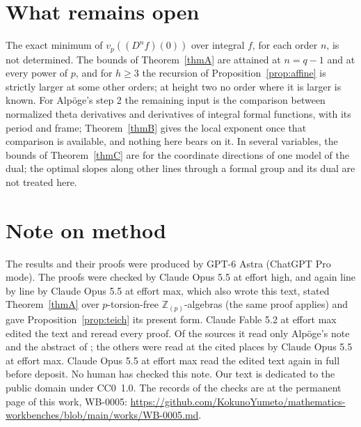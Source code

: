 \documentclass[11pt]{amsart}
\newcommand{\workbenchurl}{https://github.com/KokunoYumeto/mathematics-workbenches/blob/main/works/WB-0005.md}
\theoremstyle{definition}
\theoremstyle{remark}
\newcommand{\Z}{\mathbb Z}
\newcommand{\vp}{v_p}
\begin{document}
\section{What remains open}
The exact minimum of $\vp((D^nf)(0))$ over integral $f$, for each order $n$, is not determined. The bounds of Theorem~\ref{thmA} are attained at $n=q-1$ and at every power of $p$, and for $h\ge3$ the recursion of Proposition~\ref{prop:affine} is strictly larger at some other orders; at height two no order where it is larger is known. For Alp\"oge's step 2 the remaining input is the comparison between normalized theta derivatives and derivatives of integral formal functions, with its period and frame; Theorem~\ref{thmB} gives the local exponent once that comparison is available, and nothing here bears on it. In several variables, the bounds of Theorem~\ref{thmC} are for the coordinate directions of one model of the dual; the optimal slopes along other lines through a formal group and its dual are not treated here.

\section*{Note on method}
The results and their proofs were produced by GPT-6 Astra (ChatGPT Pro mode). The proofs were checked by Claude Opus 5.5 at effort high, and again line by line by Claude Opus 5.5 at effort max, which also wrote this text, stated Theorem~\ref{thmA} over $p$-torsion-free $\Z_{(p)}$-algebras (the same proof applies) and gave Proposition~\ref{prop:teich} its present form. Claude Fable 5.2 at effort max edited the text and reread every proof. Of the sources it read only Alp\"oge's note and the abstract of \cite{Three}; the others were read at the cited places by Claude Opus 5.5 at effort max. Claude Opus 5.5 at effort max read the edited text again in full before deposit. No human has checked this note. Our text is dedicated to the public domain under CC0~1.0. The records of the checks are at the permanent page of this work, WB-0005: \expandafter\url\expandafter{\workbenchurl}.
\end{document}

